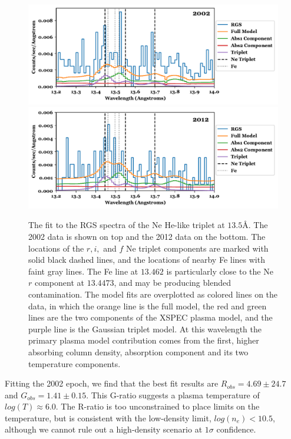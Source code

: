 \begin{figure}
    \centering
    \includegraphics[width=0.98\linewidth]{Figures/SU Aur/figure_ne_triplet_fit_2002.pdf}
    \includegraphics[width=0.98\linewidth]{Figures/SU Aur/figure_ne_triplet_fit_2012.pdf}
    \caption{The fit to the RGS spectra of the Ne He-like triplet at $13.5$\AA. The 2002 data is shown on top and the 2012 data on the bottom. The locations of the $r, i, $ and $f$ Ne triplet components are marked with solid black dashed lines, and the locations of nearby Fe lines with faint gray lines. The Fe line at $13.462$ is particularly close to the Ne $r$ component at $13.4473$, and may be producing blended contamination. The model fits are overplotted as colored lines on the data, in which the orange line is the full model, the red and green lines are the two components of the XSPEC plasma model, and the purple line is the Gaussian triplet model. At this wavelength the primary plasma model contribution comes from the first, higher absorbing column density, absorption component and its two temperature components.}
    \label{fig:ne_triplet}
\end{figure}

Fitting the 2002 epoch, we find that the best fit results are  $R_{obs} = 4.69\pm24.7$ and $G_{obs}=1.41\pm0.15$. This G-ratio suggests a plasma temperature of $log(T)\approx6.0$. The R-ratio is too unconstrained to place limits on the temperature, but is consistent with the low-density limit, $log(n_e) < 10.5$, although we cannot rule out a high-density scenario at $1\sigma$ confidence.

